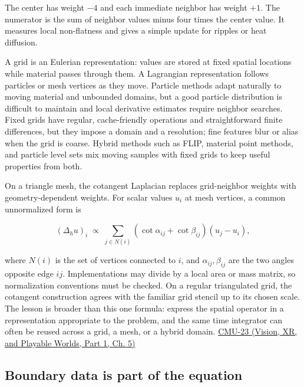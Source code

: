 The center has weight \(-4\) and each immediate neighbor has weight \(+1\). The numerator is the sum of neighbor values minus four times the center value. It measures local non-flatness and gives a simple update for ripples or heat diffusion.

A grid is an Eulerian representation: values are stored at fixed spatial locations while material passes through them. A Lagrangian representation follows particles or mesh vertices as they move. Particle methods adapt naturally to moving material and unbounded domains, but a good particle distribution is difficult to maintain and local derivative estimates require neighbor searches. Fixed grids have regular, cache-friendly operations and straightforward finite differences, but they impose a domain and a resolution; fine features blur or alias when the grid is coarse. Hybrid methods such as FLIP, material point methods, and particle level sets mix moving samples with fixed grids to keep useful properties from both.

On a triangle mesh, the cotangent Laplacian replaces grid-neighbor weights with geometry-dependent weights. For scalar values \(u_i\) at mesh vertices, a common unnormalized form is

\[
(\Delta_h u)_i\;\propto\;\sum_{j\in N(i)}(\cot\alpha_{ij}+\cot\beta_{ij})(u_j-u_i),
\]

where \(N(i)\) is the set of vertices connected to \(i\), and \(\alpha_{ij},\beta_{ij}\) are the two angles opposite edge \(ij\). Implementations may divide by a local area or mass matrix, so normalization conventions must be checked. On a regular triangulated grid, the cotangent construction agrees with the familiar grid stencil up to its chosen scale. The lesson is broader than this one formula: express the spatial operator in a representation appropriate to the problem, and the same time integrator can often be reused across a grid, a mesh, or a hybrid domain. \href{../07-Vision-XR-and-Playable-Worlds-P01/main.pdf\#nameddest=04-visual-computing-ii-ch036-cmu-23---physically-based-animation-and-pdes}{CMU-23 (Vision, XR, and Playable Worlds, Part 1, Ch. 5)}

\subsection{Boundary data is part of the equation}\label{04-visual-computing-ii-ch030-boundary-data-is-part-of-the-equation}

\hypertarget{04-visual-computing-ii-ch030-boundary-data-is-part-of-the-equation}{}

